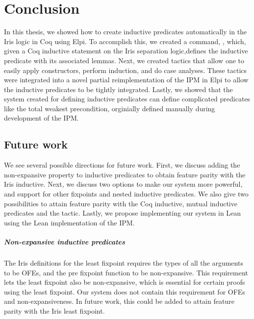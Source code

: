 \documentclass[thesis.tex]{subfiles}
\begin{document}
\VerbatimFootnotes

\chapter{Conclusion}\label{ch:conclusion}
In this thesis, we showed how to create inductive predicates automatically in the Iris logic in Coq using Elpi. To accomplish this, we created a command, , which, given a Coq inductive statement on the Iris separation logic,defines the inductive predicate with its associated lemmas. Next, we created tactics that allow one to easily apply constructors, perform induction, and do case analyses. These tactics were integrated into a novel partial reimplementation of the IPM in Elpi to allow the inductive predicates to be tightly integrated. Lastly, we showed that the system created for defining inductive predicates can define complicated predicates like the total weakest precondition, orginially defined manually during development of the IPM.

\section{Future work}
We see several possible directions for future work. First, we discuss adding the non-expansive property to inductive predicates to obtain feature parity with the Iris inductive. Next, we discuss two options to make our system more powerful, and support for other fixpoints and nested inductive predicates. We also give two possibilities to attain feature parity with the Coq inductive, mutual inductive predicates and the  tactic. Lastly, we propose implementing our system in Lean using the Lean implementation of the IPM.

\paragraph{Non-expansive inductive predicates}
The Iris definitions for the least fixpoint requires the types of all the arguments to be OFEs, and the pre fixpoint function to be non-expansive. This requirement lets the least fixpoint also be non-expansive, which is essential for certain proofs using the least fixpoint. Our system does not contain this requirement for OFEs and non-expansiveness. In future work, this could be added to attain feature parity with the Iris least fixpoint.
\end{document}
